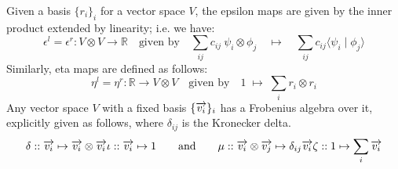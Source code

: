 %
Given a basis $\{r_i\}_i$ for a vector space $V$, the epsilon maps are
given by the inner product extended by linearity; i.e. we have:
\[
\epsilon^l  =  \epsilon^r \colon   V \otimes V \to \mathbb{R} \quad \mbox{given by} \quad
\sum_{ij} c_{ij} \ \psi_i \otimes \phi_j  \quad \mapsto \quad \sum_{ij} c_{ij} \langle \psi_i \mid \phi_j \rangle\]
Similarly, eta maps   are defined as follows:
\[
\eta^l = \eta^r \colon   \mathbb{R} \to V \otimes V
\quad \mbox{given by} \quad 
1 \; \mapsto \; \sum_i r_i \otimes r_i
\]
Any vector space $V$ with a fixed basis
$\{\overrightarrow{v_i}\}_i$ has a Frobenius algebra over it, explicitly given as follows, where $\delta_{ij}$ is the Kronecker delta.
\begin{equation*}\label{eq:frob}
\delta :: \overrightarrow{v_i} \mapsto \overrightarrow{v_i} \otimes \overrightarrow{v_i}  \iota:: \overrightarrow{v_i} \mapsto 1 \qquad \text{and} \qquad
\mu:: \overrightarrow{v_i} \otimes \overrightarrow{v_j} \mapsto 
\delta_{ij}\overrightarrow{v_i} 
 \zeta:: 1 \mapsto   \sum_i  \overrightarrow{v_i}  
\end{equation*}




